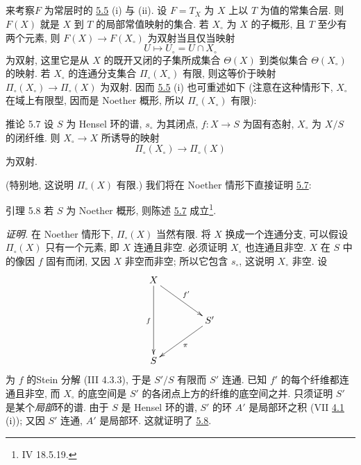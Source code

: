 \subsection{}
来考察\pageoriginale $F$ 为常层时的 \hyperref[XII.cor5.5]{5.5} (i) 与 (ii). 设 $F=T_X$ 为 $X$ 上以 $T$ 为值的常集合层. 则 $F(X)$ 就是 $X$ 到 $T$ 的局部常值映射的集合. 若 $X_{\circ}$ 为 $X$ 的子概形, 且 $T$ 至少有两个元素, 则 $F(X)\longrightarrow F(X_{\circ})$ 为双射当且仅当映射
$$
U\longmapsto U_{\circ}=U\cap X_{\circ}
$$
为双射, 这里它是从 $X$ 的既开又闭的子集所成集合 $\Theta(X)$ 到类似集合 $\Theta(X_{\circ})$ 的映射. 若 $X_{\circ}$ 的连通分支集合 $\Pi_{\circ}(X_{\circ})$ 有限, 则这等价于映射 $\Pi_{\circ}(X_{\circ})\longrightarrow\Pi_{\circ}(X)$ 为双射. 因而 \hyperref[XII.cor5.5]{5.5} (i) 也可重述如下 (注意在这种情形下, $X_{\circ}$ 在域上有限型, 因而是 Noether 概形, 所以 $\Pi_{\circ}(X_{\circ})$ 有限):

\begin{enonce*}{推论 5.7}
设 $S$ 为 Hensel 环的谱, $s_{\circ}$ 为其闭点, $f:X\longrightarrow S$ 为固有态射, $X_{\circ}$ 为 $X/S$ 的闭纤维. 则 $X_{\circ}\longrightarrow X$ 所诱导的映射
$$
\Pi_{\circ}(X_{\circ})\longrightarrow\Pi_{\circ}(X)
$$
为双射.
\end{enonce*}

(特别地, 这说明 $\Pi_{\circ}(X)$ 有限.) 我们将在 Noether 情形下直接证明 \hyperref[XII.cor5.7]{5.7}:

\begin{enonce*}{引理 5.8}
若 $S$ 为 Noether 概形, 则陈述 \hyperref[XII.cor5.7]{5.7} 成立\footnote[1]{\Cf \EGA IV 18.5.19.}.
\end{enonce*}

\emph{证明.} 在 Noether 情形下, $\Pi_{\circ}(X)$ 当然有限. 将 $X$ 换成一个连通分支, 可以假设 $\Pi_{\circ}(X)$ 只有一个元素, 即 $X$ 连通且非空. 必须证明 $X_{\circ}$ 也连通且非空. $X$ 在 $S$ 中的像因 $f$ 固有而闭, 又因 $X$ 非空而非空; 所以它包含 $s_{\circ}$, 这说明 $X_{\circ}$ 非空. 设
$$
\xymatrix@R=1cm@C=1.5cm{
X \ar[rd]^{f'} \ar[dd]_{f}& \\
  & S'\ar[ld]^{\pi}\\
S &
}
$$
为 $f$ 的\pageoriginale Stein 分解 (\EGA III 4.3.3), 于是 $S'/S$ 有限而 $S'$ 连通. 已知 $f'$ 的每个纤维都连通且非空, 而 $X_{\circ}$ 的底空间是 $S'$ 的各闭点上方的纤维的底空间之并. 只须证明 $S'$ 是某个\emph{局部}环的谱. 由于 $S$ 是 Hensel 环的谱, $S'$ 的环 $A'$ 是局部环之积 (VII \hyperref[VII.prop4.1]{4.1} (i)); 又因 $S'$ 连通, $A'$ 是局部环. 这就证明了 \hyperref[XII.lem5.8]{5.8}.


